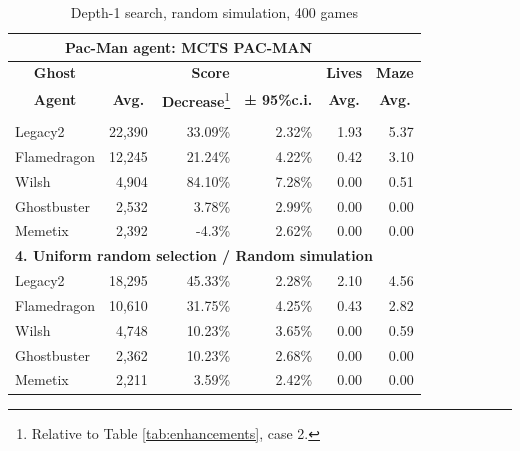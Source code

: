 \documentclass[journal]{IEEEtran}
\begin{document}
\begin{table}[htbp]

  \centering
  \caption{Depth-1 search, random simulation, 400 games}
  \begin{minipage}{\textwidth}
    \begin{tabular}{lrrrrr}
    \toprule
    \multicolumn{5}{c}{\textbf{Pac-Man agent: MCTS PAC-MAN}} \\
    \midrule
\multicolumn{1}{c}{\textbf{Ghost}} & \multicolumn{3}{c}{\textbf{Score}} & \multicolumn{1}{c}{\textbf{Lives}} & \multicolumn{1}{c}{\textbf{Maze}} \\
    \multicolumn{1}{c}{\textbf{Agent}} & \multicolumn{1}{c}{\textbf{Avg.}} & \multicolumn{1}{c}{\textbf{Decrease}\footnote{Relative to Table \ref{tab:enhancements}, case 2.}} & \multicolumn{1}{c}{\textbf{± 95\%c.i.}} & \multicolumn{1}{c}{\textbf{Avg.}} & \multicolumn{1}{c}{\textbf{Avg.}} \\ \noalign{\smallskip}
    \multicolumn{6}{l}{\textbf{3. UCT selection / Random simulation}} \\
    {\sc Legacy2 } & 22,390 & 33.09\% & 2.32\% & 1.93  & 5.37 \\
    {\sc Flamedragon } & 12,245 & 21.24\% & 4.22\% & 0.42  & 3.10 \\
    {\sc Wilsh } & 4,904 & 84.10\% & 7.28\% & 0.00  & 0.51 \\
    {\sc Ghostbuster } & 2,532 & 3.78\% & 2.99\% & 0.00  & 0.00 \\
    {\sc Memetix } & 2,392 & -4.3\% & 2.62\% & 0.00  & 0.00 \\
    \multicolumn{6}{l}{\textbf{4. Uniform random selection / Random simulation}} \\
    {\sc Legacy2 } & 18,295 & 45.33\% & 2.28\% & 2.10  & 4.56 \\
    {\sc Flamedragon } & 10,610 & 31.75\% & 4.25\% & 0.43  & 2.82 \\
    {\sc Wilsh } & 4,748 & 10.23\% & 3.65\% & 0.00  & 0.59 \\
    {\sc Ghostbuster } & 2,362 & 10.23\% & 2.68\% & 0.00  & 0.00 \\
    {\sc Memetix } & 2,211 & 3.59\% & 2.42\% & 0.00  & 0.00 \\
    \bottomrule
    \end{tabular}%
  \label{tab:single_ply_random}%
  \end{minipage}
\end{table}%
\end{document}
